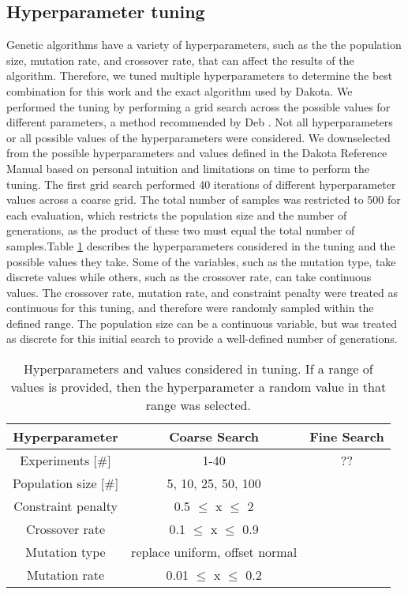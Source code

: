 \subsection{Hyperparameter tuning}
Genetic algorithms have a variety of hyperparameters, such as the the 
population size, mutation rate, and crossover rate, that can affect 
the results of the algorithm. Therefore, we tuned multiple hyperparameters
to determine the best combination for this work and the exact algorithm 
used by Dakota. We performed the tuning by performing a grid search across 
the possible values for different parameters, a method recommended 
by Deb \cite{deb_multi-objective_2001}. Not all hyperparameters or 
all possible values of the hyperparameters were considered. We downselected from 
the possible hyperparameters and values defined in the Dakota Reference 
Manual based on personal intuition and limitations on time to perform 
the tuning. The 
first grid search performed 40 iterations of different hyperparameter 
values across a coarse grid. The total number of samples was restricted to 
500 for each evaluation, which restricts the population size and the 
number of generations, as the product of these two must equal the 
total number of samples.Table \ref{tab:soga_tuning} describes 
the hyperparameters considered in the tuning and the possible 
values they take. Some of the variables, such as the mutation 
type, take discrete values while others, such as the crossover 
rate, can take continuous values. The crossover rate, mutation 
rate, and constraint penalty were treated as continuous for this 
tuning, and therefore were randomly sampled within the defined range. 
The population size can be a continuous variable, but was 
treated as discrete for this initial search to provide a well-defined 
number of generations.

\begin{table}
    \centering 
    \caption{Hyperparameters and values considered in tuning. If a range 
    of values is provided, then the hyperparameter a random value in 
    that range was selected.}
    \label{tab:soga_tuning}
    \begin{tabular}{c c c}
        \hline
        Hyperparameter & Coarse Search & Fine Search \\
        \hline 
        Experiments [\#] & 1-40 & ?? \\
        Population size [\#] & 5, 10, 25, 50, 100 & \\
        Constraint penalty & 0.5 $\leq$ x $\leq$ 2 & \\
        Crossover rate & 0.1 $\leq$ x $\leq$ 0.9 & \\
        Mutation type & replace uniform, offset normal & \\
        Mutation rate & 0.01 $\leq$ x $\leq$ 0.2 & \\
        \hline       
    \end{tabular}
\end{table}




